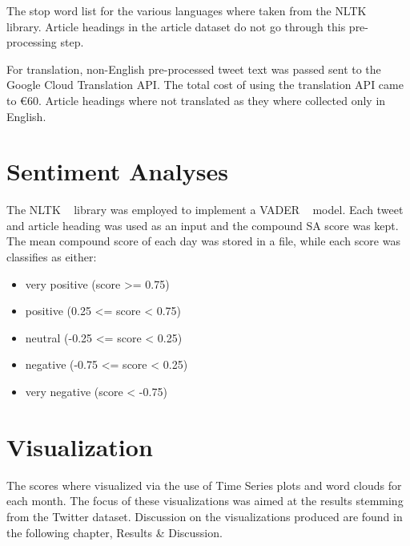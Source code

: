 \noindent The stop word list for the various languages where taken from the \ac{NLTK} ~\citep{bird2009natural} library.
Article headings in the article dataset do not go through this pre-processing step.

For translation, non-English pre-processed tweet text was passed sent to the Google Cloud Translation \ac{API}.
The total cost of using the translation \ac{API} came to €60.
Article headings where not translated as they where collected only in English.

\section{Sentiment Analyses}

The \ac{NLTK} ~\citep{bird2009natural} library was employed to implement a \ac{VADER} ~\citep{Hutto_Gilbert_2014} model.
Each tweet and article heading was used as an input and the compound \ac{SA} score was kept.
The mean compound score of each day was stored in a file, while each score was classifies as either:

\begin{itemize}
    \item very positive (score >= 0.75)
    \item positive (0.25 <= score < 0.75)
    \item neutral (-0.25 <= score < 0.25)
    \item negative (-0.75 <= score < 0.25)
    \item very negative (score < -0.75)
\end{itemize}

\section{Visualization}

The  scores where visualized via the use of Time Series plots and word clouds for each month.
The focus of these visualizations was aimed at the results stemming from the Twitter dataset.
Discussion on the visualizations produced are found in the following chapter, Results \& Discussion.